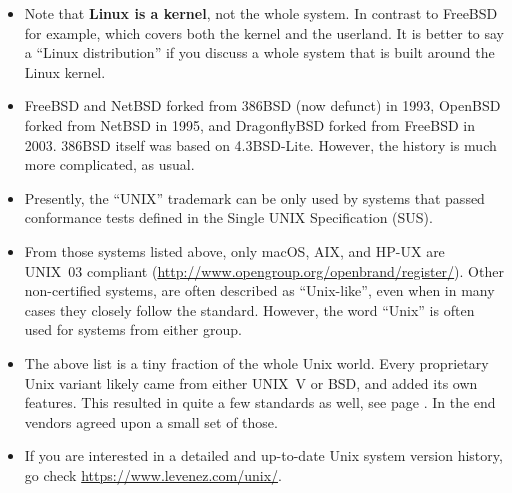 \documentclass[article]{seminar}
\newcommand{\sltitle}[1]{{\centering\textbf{\Large #1}
    \vskip 2em plus 0pt minus 2em\par}} %
\newcommand{\emsl}[1]{\textbf{#1}} %
\begin{document}

\begin{itemize}
\item Note that \emsl{Linux is a kernel}, not the whole system.  In contrast to
FreeBSD for example, which covers both the kernel and the userland.  It is
better to say a ``Linux distribution'' if you discuss a whole system that is
built around the Linux kernel.
\item FreeBSD and NetBSD forked from 386BSD (now defunct) in 1993, OpenBSD
forked from NetBSD in 1995, and DragonflyBSD forked from FreeBSD in 2003.
386BSD itself was based on 4.3BSD-Lite.  However, the history is much more
complicated, as usual.
\item Presently, the ``UNIX'' trademark can be only used by systems that passed
conformance tests defined in the Single UNIX Specification (SUS).
\item From those systems listed above, only macOS, AIX, and HP-UX are
UNIX~03 compliant (\url{http://www.opengroup.org/openbrand/register/}).  Other
non-certified systems, are often described as ``Unix-like'', even when in many
cases they closely follow the standard.  However, the word ``Unix'' is often used
for systems from either group.
\item The above list is a tiny fraction of the whole Unix world.  Every
proprietary Unix variant likely came from either UNIX~V or BSD, and added its
own features.  This resulted in quite a few standards as well, see page
\pageref{UNIXSTANDARDS}.  In the end vendors agreed upon a small set of those.
\item If you are interested in a detailed and up-to-date Unix system version
history, go check \url{https://www.levenez.com/unix/}.
\end{itemize}
\end{document}

